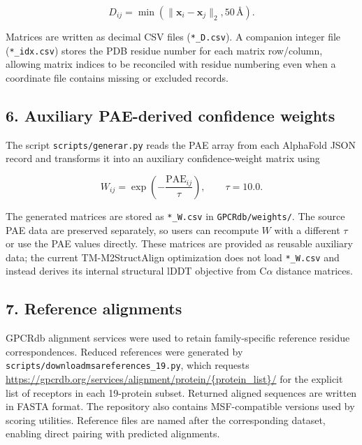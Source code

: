 \documentclass[a4paper,12pt]{article}
\begin{document}
	\begin{equation}
		D_{ij}=\min\left(\lVert \mathbf{x}_i-\mathbf{x}_j \rVert_2, 50\,\text{\AA}\right).
	\end{equation}
	
	Matrices are written as decimal CSV files (\texttt{*\_D.csv}). A companion integer file (\texttt{*\_idx.csv}) stores the PDB residue number for each matrix row/column, allowing matrix indices to be reconciled with residue numbering even when a coordinate file contains missing or excluded records.
	
	\subsection*{6. Auxiliary PAE-derived confidence weights}
	The script \texttt{scripts/generar.py} reads the PAE array from each AlphaFold JSON record and transforms it into an auxiliary confidence-weight matrix using
	
	\begin{equation}
		W_{ij}=\exp\left(-\frac{\mathrm{PAE}_{ij}}{\tau}\right), \qquad \tau=10.0.
	\end{equation}
	
	The generated matrices are stored as \texttt{*\_W.csv} in \texttt{GPCRdb/weights/}. The source PAE data are preserved separately, so users can recompute $W$ with a different $\tau$ or use the PAE values directly. These matrices are provided as reusable auxiliary data; the current TM-M2StructAlign optimization does not load \texttt{*\_W.csv} and instead derives its internal structural lDDT objective from C$\alpha$ distance matrices.
	
	\subsection*{7. Reference alignments}
	GPCRdb alignment services were used to retain family-specific reference residue correspondences. Reduced references were generated by \texttt{scripts/downloadmsareferences\_19.py}, which requests \url{https://gpcrdb.org/services/alignment/protein/{protein_list}/} for the explicit list of receptors in each 19-protein subset. Returned aligned sequences are written in FASTA format. The repository also contains MSF-compatible versions used by scoring utilities. Reference files are named after the corresponding dataset, enabling direct pairing with predicted alignments.
	
\end{document}
